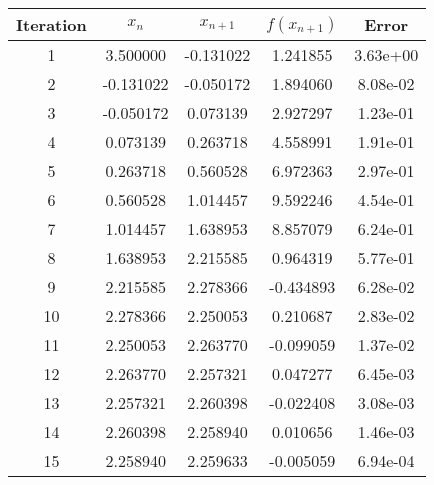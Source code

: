 \begin{tabular}{|c|c|c|c|c|}
\hline
Iteration & $x_n$ & $x_{n+1}$ & $f(x_{n+1})$ & Error \\
\hline
1 & 3.500000 & -0.131022 & 1.241855 & 3.63e+00 \\
\hline
2 & -0.131022 & -0.050172 & 1.894060 & 8.08e-02 \\
\hline
3 & -0.050172 & 0.073139 & 2.927297 & 1.23e-01 \\
\hline
4 & 0.073139 & 0.263718 & 4.558991 & 1.91e-01 \\
\hline
5 & 0.263718 & 0.560528 & 6.972363 & 2.97e-01 \\
\hline
6 & 0.560528 & 1.014457 & 9.592246 & 4.54e-01 \\
\hline
7 & 1.014457 & 1.638953 & 8.857079 & 6.24e-01 \\
\hline
8 & 1.638953 & 2.215585 & 0.964319 & 5.77e-01 \\
\hline
9 & 2.215585 & 2.278366 & -0.434893 & 6.28e-02 \\
\hline
10 & 2.278366 & 2.250053 & 0.210687 & 2.83e-02 \\
\hline
11 & 2.250053 & 2.263770 & -0.099059 & 1.37e-02 \\
\hline
12 & 2.263770 & 2.257321 & 0.047277 & 6.45e-03 \\
\hline
13 & 2.257321 & 2.260398 & -0.022408 & 3.08e-03 \\
\hline
14 & 2.260398 & 2.258940 & 0.010656 & 1.46e-03 \\
\hline
15 & 2.258940 & 2.259633 & -0.005059 & 6.94e-04 \\
\hline
\end{tabular}